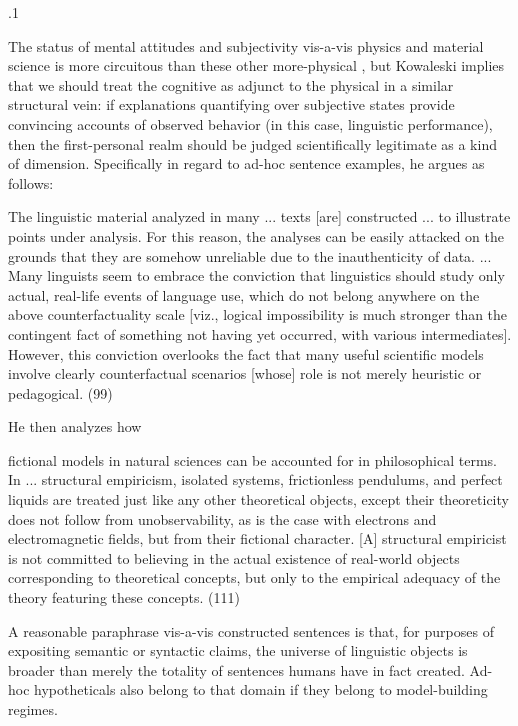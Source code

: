 \documentclass[11pt, twocolumn]{article}
\begin{document}
\p.1{%
The status of mental attitudes and subjectivity vis-a-vis physics and material
science is more circuitous than these other more-physical ,
but Kowaleski implies that we should treat the cognitive as adjunct to the
physical in a similar structural vein: if explanations quantifying
over subjective states provide convincing accounts of observed
behavior (in this case, linguistic performance), then the first-personal
realm should be judged scientifically legitimate as a kind of 
dimension.  Specifically in regard to ad-hoc sentence examples, he argues as follows:

\begin{blockQuote}
The linguistic material analyzed in many ... texts [are] constructed
... to illustrate points under analysis.
For this reason, the analyses can be easily attacked on the grounds that
they are somehow unreliable due to the inauthenticity of data. ...
Many linguists seem to embrace the conviction that linguistics should
study only actual, real-life events of language use, which do not belong anywhere on the above
counterfactuality scale [viz., logical impossibility is much stronger
than the contingent fact of something not having yet occurred, with
various intermediates].  However, this conviction overlooks the fact
that many useful scientific models involve clearly counterfactual scenarios
[whose] role is not merely heuristic or pedagogical. (99)
\end{blockQuote}

\nip
He then analyzes how \upAdj{9pt}

\begin{blockQuote}
fictional models in natural sciences can be accounted for in
philosophical terms.  In ... structural empiricism, isolated
systems, frictionless pendulums, and perfect liquids are treated just like
any other theoretical objects, except their theoreticity does not follow from
unobservability, as is the case with electrons and electromagnetic fields, but
from their fictional character.  [A] structural empiricist is not
committed to believing in the actual existence of real-world objects corresponding
to theoretical concepts, but only to the empirical adequacy of the theory
featuring these concepts.  (111)
\end{blockQuote}

\nip
A reasonable paraphrase vis-a-vis constructed sentences is that, for purposes
of expositing semantic or syntactic claims, the universe of linguistic
objects is broader than merely the totality of sentences humans have in
fact created.  Ad-hoc hypotheticals also belong to that
domain if they belong to model-building regimes.
} %
\end{document}
